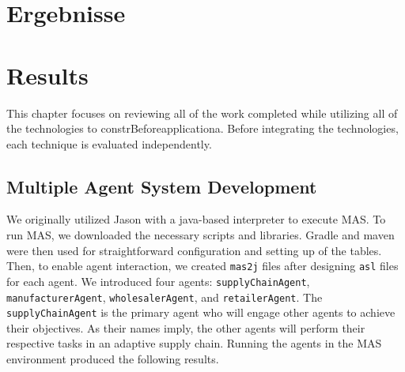 {\chapter{Ergebnisse}}
{\chapter{Results}}

\label{sec:results}

This chapter focuses on reviewing all of the work completed while utilizing all of the technologies to constrBeforeapplicationa. Before integrating the technologies, each technique is evaluated independently.

\section{Multiple Agent System Development}

We originally utilized Jason with a java-based interpreter to execute \ac{MAS}. To run \ac{MAS}, we downloaded the necessary scripts and libraries. Gradle and maven were then used for straightforward configuration and setting up of the tables. Then, to enable agent interaction, we created \texttt{mas2j} files after designing \texttt{asl} files for each agent. We introduced four agents: \texttt{supplyChainAgent}, \texttt{manufacturerAgent}, \texttt{wholesalerAgent}, and \texttt{retailerAgent}. The \texttt{supplyChainAgent} is the primary agent who will engage other agents to achieve their objectives. As their names imply, the other agents will perform their respective tasks in an adaptive supply chain. Running the agents in the \ac{MAS} environment produced the following results.

\vspace{.5cm}

